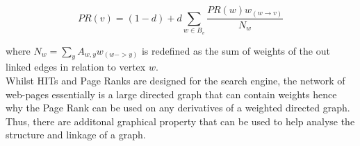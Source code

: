 \begin{equation} \label{eq:wpr}
PR(v) = (1-d) + d\sum_{w \in B_v}\frac{PR(w)w_{(w \rightarrow v)}}{N_w}
\end{equation}

where $N_w = \sum_y{A_{w,y}w_(w -> y)}$ is redefined as the sum of weights of the out linked edges in relation to vertex $w$.
\\

Whilst HITs and Page Ranks are designed for the search engine, the network of web-pages essentially is a large directed graph that can contain weights hence why the Page Rank can be used on any derivatives of a weighted directed graph. Thus, there are additonal graphical property that can be used to help analyse the structure and linkage of a graph. 
